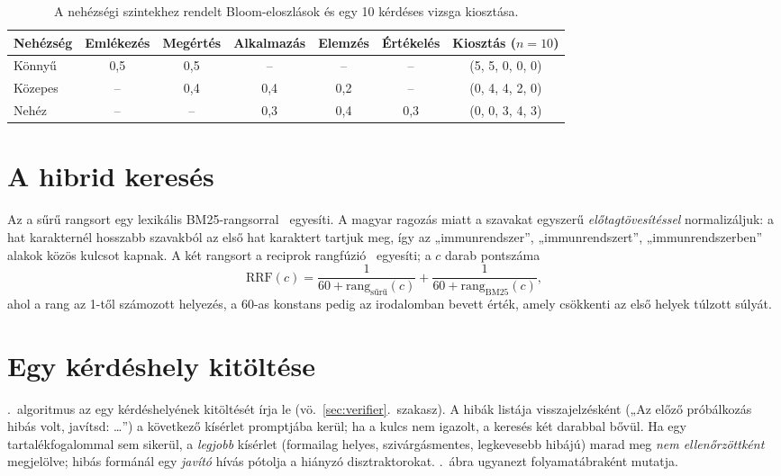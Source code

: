 \begin{table}[htbp]
\centering
\caption{A nehézségi szintekhez rendelt Bloom-eloszlások és egy 10 kérdéses vizsga kiosztása.}
\label{tab:bloom}
\small
\begin{tabular}{@{}lccccc@{\qquad}c@{}}
\toprule
Nehézség & Emlékezés & Megértés & Alkalmazás & Elemzés & Értékelés & Kiosztás ($n=10$) \\
\midrule
Könnyű   & 0,5 & 0,5 & -- & -- & -- & (5, 5, 0, 0, 0) \\
Közepes  & -- & 0,4 & 0,4 & 0,2 & -- & (0, 4, 4, 2, 0) \\
Nehéz    & -- & -- & 0,3 & 0,4 & 0,3 & (0, 0, 3, 4, 3) \\
\bottomrule
\end{tabular}
\end{table}

\section{A hibrid keresés}
\label{app-hibrid}

Az  a sűrű rangsort egy lexikális BM25-rangsorral~\cite{robertson2009bm25} egyesíti. A magyar
ragozás miatt a szavakat egyszerű \emph{előtagtövesítéssel} normalizáljuk: a hat karakternél hosszabb
szavakból az első hat karaktert tartjuk meg, így az „immunrendszer”, „immunrendszert”,
„immunrendszerben” alakok közös kulcsot kapnak. A két rangsort a reciprok rangfúzió~\cite{cormack2009rrf}
egyesíti; a $c$ darab pontszáma
\begin{equation}
\mathrm{RRF}(c)=\frac{1}{60+\mathrm{rang}_{\text{sűrű}}(c)}+\frac{1}{60+\mathrm{rang}_{\text{BM25}}(c)},
\label{eq:rrf}
\end{equation}
ahol a rang az 1-től számozott helyezés, a 60-as konstans pedig az irodalomban bevett érték, amely
csökkenti az első helyek túlzott súlyát.

\section{Egy kérdéshely kitöltése}
\label{app-slot}

\Az{\ref{alg:slot}}.~algoritmus az  egy kérdéshelyének kitöltését írja le
(vö.\ \ref{sec:verifier}.~szakasz). A hibák listája visszajelzésként („Az előző próbálkozás hibás volt,
javítsd: \dots”) a következő kísérlet promptjába kerül; ha a kulcs nem igazolt, a keresés két darabbal
bővül. Ha egy tartalékfogalommal sem sikerül, a \emph{legjobb} kísérlet (formailag helyes,
szivárgásmentes, legkevesebb hibájú) marad meg \emph{nem ellenőrzöttként} megjelölve; hibás formánál egy
\emph{javító} hívás pótolja a hiányzó disztraktorokat. \Az{\ref{fig:ellenorzo}}.~ábra ugyanezt
folyamatábraként mutatja.

